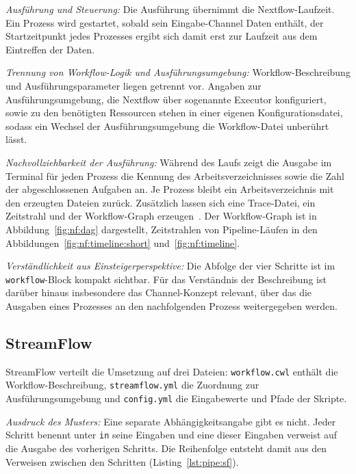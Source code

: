 \emph{Ausführung und Steuerung:} Die Ausführung übernimmt die
Nextflow-Laufzeit. Ein Prozess wird gestartet, sobald sein
Eingabe-Channel Daten enthält, der Startzeitpunkt jedes Prozesses ergibt sich damit erst zur Laufzeit aus dem Eintreffen der Daten.

\begin{sloppypar}
\emph{Trennung von Workflow-Logik und Ausführungsumgebung:}
Workflow-Beschreibung und Ausführungsparameter liegen getrennt vor.
Angaben zur Ausführungsumgebung, die Nextflow über sogenannte
Executor konfiguriert, sowie zu den benötigten Ressourcen stehen in
einer eigenen Konfigurationsdatei, sodass ein Wechsel der
Ausführungsumgebung die Workflow-Datei unberührt lässt.
\end{sloppypar}


\emph{Nachvollziehbarkeit der Ausführung:} Während des Laufs zeigt die
Ausgabe im Terminal für jeden Prozess die Kennung des
Arbeitsverzeichnisses sowie die Zahl der abgeschlossenen Aufgaben an.
Je Prozess bleibt ein Arbeitsverzeichnis mit den erzeugten Dateien
zurück. Zusätzlich lassen sich eine Trace-Datei, ein Zeitstrahl und
der Workflow-Graph erzeugen~\cite{nextflowdocs-reports}. Der Workflow-Graph ist in
Abbildung~\ref{fig:nf:dag} dargestellt, Zeitstrahlen von
Pipeline-Läufen in den Abbildungen~\ref{fig:nf:timeline:short}
und~\ref{fig:nf:timeline}.

\emph{Verständlichkeit aus Einsteigerperspektive:} Die Abfolge der
vier Schritte ist im \texttt{workflow}-Block kompakt sichtbar. Für das
Verständnis der Beschreibung ist darüber hinaus insbesondere das
Channel-Konzept relevant, über das die Ausgaben eines Prozesses an
den nachfolgenden Prozess weitergegeben werden.

\subsection{StreamFlow}
\label{sec:lokal:pipeline:streamflow}

StreamFlow verteilt die Umsetzung auf drei Dateien:
\texttt{workflow.cwl} enthält die Workflow-Beschreibung,
\texttt{streamflow.yml} die Zuordnung zur Ausführungsumgebung und
\texttt{config.yml} die Eingabewerte und Pfade der Skripte.

\emph{Ausdruck des Musters:} Eine separate Abhängigkeitsangabe gibt
es nicht. Jeder Schritt benennt unter \texttt{in} seine Eingaben und
eine dieser Eingaben verweist auf die Ausgabe des vorherigen
Schritts. Die Reihenfolge entsteht damit aus den Verweisen zwischen
den Schritten (Listing~\ref{lst:pipe:sf}).

